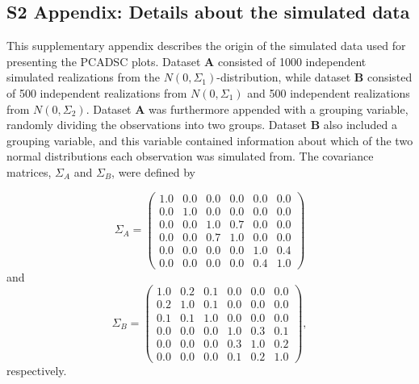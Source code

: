 \documentclass[a4paper,12pt]{article}
\begin{document}
\subsection*{S2 Appendix: Details about the simulated data}
\label{appendix.simData}
This supplementary appendix describes the origin of the simulated data used for presenting the PCADSC plots. Dataset $\mathbf{A}$ consisted of 1000 independent simulated realizations from the $N(0, \Sigma_1)$-distribution, while dataset $\mathbf{B}$ consisted of 500 independent realizations from $N(0, \Sigma_1)$ and 500 independent realizations from $N(0, \Sigma_2)$. Dataset $\mathbf{A}$ was furthermore appended with a grouping variable, randomly dividing the observations into two groups. Dataset $\mathbf{B}$ also included a grouping variable, and this variable contained information about which of the two normal distributions each observation was simulated from. The covariance matrices, $\Sigma_A$ and $\Sigma_B$, were defined by

$$\Sigma_A = \begin{pmatrix}
    1.0  &  0.0 & 0.0 & 0.0 & 0.0 & 0.0 \\
 0.0  &  1.0 & 0.0 & 0.0&  0.0 & 0.0 \\
 0.0   & 0.0 &  1.0 & 0.7 & 0.0 & 0.0 \\
 0.0 &  0.0 & 0.7 & 1.0 & 0.0 & 0.0 \\
0.0 &    0.0 &  0.0 & 0.0 & 1.0 & 0.4 \\
 0.0 & 0.0 &  0.0 & 0.0 & 0.4 & 1.0
\end{pmatrix}$$
and
$$
\Sigma_B = \begin{pmatrix}
 1.0 & 0.2 & 0.1 & 0.0 & 0.0 & 0.0 \\
 0.2 & 1.0 & 0.1 & 0.0 & 0.0 & 0.0 \\
 0.1 & 0.1 & 1.0 & 0.0 & 0.0 & 0.0 \\
 0.0 & 0.0 & 0.0 & 1.0 & 0.3 & 0.1 \\
 0.0 & 0.0 & 0.0 & 0.3 & 1.0 & 0.2 \\
 0.0 & 0.0 & 0.0 & 0.1 & 0.2 & 1.0
\end{pmatrix},
$$
respectively.
\end{document}
